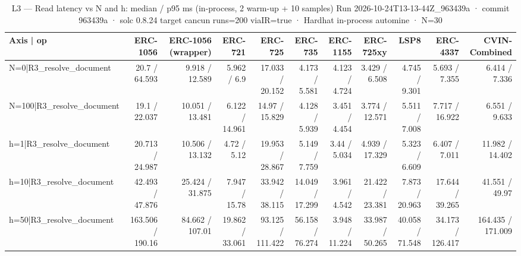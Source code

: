 \begin{table}[ht]
\centering
\small
\begin{tabular}{lrrrrrrrrrr}
\toprule
Axis | op & ERC-1056 & ERC-1056 (wrapper) & ERC-721 & ERC-725 & ERC-735 & ERC-1155 & ERC-725xy & LSP8 & ERC-4337 & CVIN-Combined \\
\midrule
N=0|R3\_resolve\_document & 20.7 / 64.593 & 9.918 / 12.589 & 5.962 / 6.9 & 17.033 / 20.152 & 4.173 / 5.581 & 4.123 / 4.724 & 3.429 / 6.508 & 4.745 / 9.301 & 5.693 / 7.355 & 6.414 / 7.336 \\
N=100|R3\_resolve\_document & 19.1 / 22.037 & 10.051 / 13.481 & 6.122 / 14.961 & 14.97 / 15.829 & 4.128 / 5.939 & 3.451 / 4.454 & 3.774 / 12.571 & 5.511 / 7.008 & 7.717 / 16.922 & 6.551 / 9.633 \\
h=1|R3\_resolve\_document & 20.713 / 24.987 & 10.506 / 13.132 & 4.72 / 5.12 & 19.953 / 28.867 & 5.149 / 7.759 & 3.44 / 5.034 & 4.939 / 17.329 & 5.323 / 6.609 & 6.407 / 7.011 & 11.982 / 14.402 \\
h=10|R3\_resolve\_document & 42.493 / 47.876 & 25.424 / 31.875 & 7.947 / 15.78 & 33.942 / 38.115 & 14.049 / 17.299 & 3.961 / 4.542 & 21.422 / 23.381 & 7.873 / 20.963 & 17.644 / 39.265 & 41.551 / 49.97 \\
h=50|R3\_resolve\_document & 163.506 / 190.16 & 84.662 / 107.01 & 19.862 / 33.061 & 93.125 / 111.422 & 56.158 / 76.274 & 3.948 / 11.224 & 33.987 / 50.265 & 40.058 / 71.548 & 34.173 / 126.417 & 164.435 / 171.009 \\
\bottomrule
\end{tabular}
\caption{L3 — Read latency vs N and h: median / p95 ms (in-process, 2 warm-up + 10 samples) Run 2026-10-24T13-13-44Z\_963439a · commit 963439a · solc 0.8.24 target cancun runs=200 viaIR=true · Hardhat in-process automine · N=30}
\label{tab:scale_latency}
\end{table}
